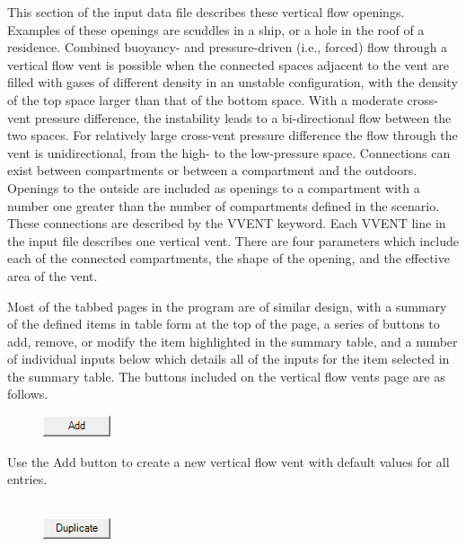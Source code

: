 This section of the input data file describes these vertical flow openings. Examples of these openings are scuddles in a ship, or a hole in the roof of a residence. Combined buoyancy- and pressure-driven (i.e., forced) flow through a vertical flow vent is possible when the connected spaces adjacent to the vent are filled with gases of different density in an unstable configuration, with the density of the top space larger than that of the bottom space. With a moderate cross-vent pressure difference, the instability leads to a bi-directional flow between the two spaces. For relatively large cross-vent pressure difference the flow through the vent is unidirectional, from the high- to the low-pressure space.
Connections can exist between compartments or between a compartment and the outdoors. Openings to the outside are included as openings to a compartment with a number one greater than the number of compartments defined in the scenario.  These connections are described by the VVENT keyword. Each VVENT line in the input file describes one vertical vent.  There are four parameters which include each of the connected compartments, the shape of the opening, and the effective area of the vent.

Most of the tabbed pages in the program are of similar design, with a summary of the defined items in table form at the top of the page, a series of buttons to add, remove, or modify the item highlighted in the summary table, and a number of individual inputs below which details all of the inputs for the item selected in the summary table. The buttons included on the vertical flow vents page are as follows.

\begin{figure}
  \includegraphics[width=0.781in]{FIGURES/Input_File/Add_Button}
\end{figure}

Use the Add button to create a new vertical flow vent with default values for all entries. \\~ \\

\begin{figure}
  \includegraphics[width=0.781in]{FIGURES/Input_File/Duplicate_Button}
\end{figure}

